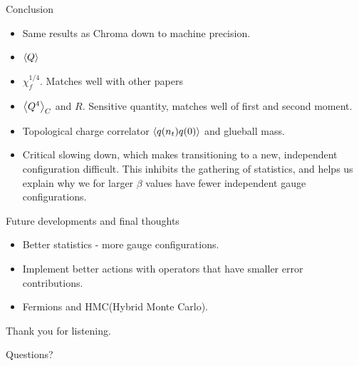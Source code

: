 \documentclass[10pt,show notes on second screen]{beamer}
\begin{document}
\begin{frame}{Conclusion}
{\begin{itemize}
    \item <2->Same results as Chroma down to machine precision.
    \item <4->$\left\langle{Q}\right\rangle$
    \item <5->$\chi^{1/4}_f$. Matches well with other papers
    \item <6->$\left\langle{Q^4}\right\rangle_C$ and $R$. Sensitive quantity, matches well of first and second moment.
    \item <7->Topological charge correlator $\left\langle{q(n_t)q(0)}\right\rangle$ and glueball mass.
    \item <8->Critical slowing down, which makes transitioning to a new, independent configuration difficult. This inhibits the gathering of statistics, and helps us explain why we for larger $\beta$ values have fewer independent gauge configurations.
\end{itemize}
}
\end{frame}

\begin{frame}{Future developments and final thoughts}
\begin{itemize}[<+->]
    \item Better statistics - more gauge configurations.
    \item Implement better actions with operators that have smaller error contributions.
    \item Fermions and HMC(Hybrid Monte Carlo).
\end{itemize}
\end{frame}

\begin{frame}
\begin{center}
Thank you for listening.
\end{center}
\vspace{5pt}
\begin{center}
Questions?
\end{center}
\end{frame}
\end{document}
